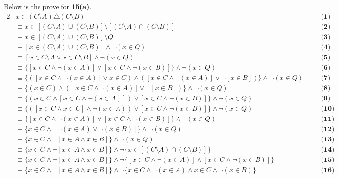 Below is the prove for \textbf{15(a)}. 
\begin{alignat*}{2}
&x \in (C \setminus A) \triangle (C \setminus B) && \quad \textbf{(1)}\\
&\equiv x \in [(C \setminus A) \cup (C \setminus B)] \setminus [(C \setminus A) \cap (C \setminus B)] && \quad \textbf{(2)}\\
&\equiv x \in [(C \setminus A) \cup (C \setminus B)] \setminus Q && \quad \textbf{(3)}\\
&\equiv [x \in (C \setminus A) \cup (C \setminus B)] \wedge \neg (x \in Q) && \quad \textbf{(4)}\\
&\equiv [x \in C \setminus A \vee x \in C \setminus B] \wedge \neg (x \in Q) && \quad \textbf{(5)}\\
&\equiv \{[x \in C \wedge \neg (x \in A)] \vee [x \in C \wedge \neg (x \in B)]\} \wedge \neg (x \in Q) && \quad \textbf{(6)}\\
&\equiv \{([x \in C \wedge \neg (x \in A)] \vee x \in C) \wedge ([x \in C \wedge \neg (x \in A)] \vee \neg [x \in B])\} \wedge \neg (x \in Q) && \quad \textbf{(7)}\\
&\equiv \{(x \in C) \wedge ([x \in C \wedge \neg (x \in A)] \vee \neg [x \in B])\} \wedge \neg (x \in Q) && \quad \textbf{(8)}\\
&\equiv \{(x \in C \wedge [x \in C \wedge \neg (x \in A)]) \vee [x \in C \wedge \neg (x \in B)]\} \wedge \neg (x \in Q) && \quad \textbf{(9)}\\
&\equiv \{([x \in C \wedge x \in C] \wedge \neg (x \in A)) \vee [x \in C \wedge \neg (x \in B)]\} \wedge \neg (x \in Q) && \quad \textbf{(10)}\\
&\equiv \{[x \in C \wedge \neg (x \in A)] \vee [x \in C \wedge \neg (x \in B)]\} \wedge \neg (x \in Q) && \quad \textbf{(11)}\\
&\equiv \{x \in C \wedge [\neg (x \in A) \vee \neg (x \in B)]\} \wedge \neg (x \in Q) && \quad \textbf{(12)}\\
&\equiv \{x \in C \wedge \neg [x \in A \wedge x \in B]\} \wedge \neg (x \in Q) && \quad \textbf{(13)}\\
&\equiv \{x \in C \wedge \neg [x \in A \wedge x \in B]\} \wedge \neg \{x \in [(C \setminus A) \cap (C \setminus B)]\} && \quad \textbf{(14)}\\
&\equiv \{x \in C \wedge \neg [x \in A \wedge x \in B]\} \wedge \neg \{[x \in C \wedge \neg (x \in A)] \wedge [x \in C \wedge \neg (x \in B)]\} && \quad \textbf{(15)}\\
&\equiv \{x \in C \wedge \neg [x \in A \wedge x \in B]\} \wedge \neg \{x \in C \wedge \neg (x \in A) \wedge x \in C \wedge \neg (x \in B)\} && \quad \textbf{(16)}\\

\end{alignat*}
